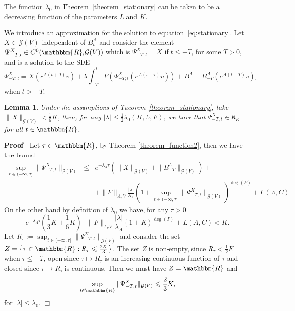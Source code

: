 \documentclass[11pt]{article}
\newcommand{\assign}{:=}
\newenvironment{proof}{\noindent\textbf{Proof\ }}{\hspace*{\fill}$\Box$\medskip}
\newtheorem{lemma}{Lemma}
\begin{document}
\begin{remark}
  \label{remark_lambda0}The function $\lambda_0$ in
  Theorem~\ref{theorem_stationary} can be taken to be a decreasing function of
  the parameters $L$ and $K$.
\end{remark}

We introduce an approximation for the solution to
equation~{\eqref{eq:stationary}}. Let $X \in \mathcal{G} (V)$ independent of
$B^A_t$ and consider the element $\Psi_{- T, t}^X \in C^0 (\mathbbm{R},
\mathcal{G} (V))$ which is $\Psi_{- T, t}^X = X$ if $t \leqslant - T$, for
some $T > 0$, and is a solution to the SDE
\[ \Psi_{- T, t}^X = X (e^{A (t + T)} v) + \lambda \int_{- T}^t F (\Psi_{- T,
   t}^X (e^{A (t - \tau)} v)) + B^A_t - B^A_{- T} (e^{A (t + T)} v), \]
when $t > - T$.

\begin{lemma}
  \label{lemma_bound}Under the assumptions of
  Theorem~\ref{theorem_stationary}, take $\| X \|_{\mathcal{G} (V)} <
  \frac{1}{6} K$, then, for any $| \lambda | \leqslant \frac{1}{2} \lambda_0
  (K, L, F)$, we have that $\Psi_{- T, t}^X \in \mathfrak{K}_K$ for all $t \in
  \mathbbm{R}$.
\end{lemma}

\begin{proof}
  Let $\tau \in \mathbbm{R}$, by Theorem \ref{theorem_function2}, then we have
  the bound
  \begin{eqnarray}
    \sup_{t \in (- \infty, \tau]} \| \Psi^X_{- T, t} \|_{\mathcal{G} (V)} &
    \leqslant & e^{- \lambda_A \tau} (\| X \|_{\mathcal{G} (V)} + \| B_{- T}^A
    \|_{\mathcal{G} (V)}) + \nonumber\\
    &  & + \| F \|_{\Lambda_{\pi} V} \frac{| \lambda |}{\lambda_A} (1 +
    \sup_{t \in (- \infty, \tau]} \| \Psi_{- T, t}^X \|_{\mathcal{G}
    (V)})^{\deg (F)} + L (A, C) . \nonumber
  \end{eqnarray}
  On the other hand by definition of $\lambda_0$ we have, for any $\tau > 0$
  \[ e^{- \lambda_A \tau} \left( \frac{1}{3} K + \frac{1}{6} K \right) + \| F
     \|_{\Lambda_{\pi} V} \frac{| \lambda |}{\lambda_A} (1 + K)^{\deg (F)} + L
     (A, C) < K. \]
  Let $R_{\tau} \assign \sup_{t \in (- \infty, \tau]} \| \Psi_{- T, t}^X
  \|_{\mathcal{G} (V)}$ and consider the set $Z = \left\{ \tau \in \mathbbm{R}:
  R_{\tau} \leqslant \frac{2 K}{3} \right\}$. The set $Z$ is non-empty, since
  $R_{\tau} < \frac{1}{2} K$ when $\tau \leqslant - T$, open since $\tau
  \mapsto R_{\tau}$ is an increasing continuous function of $\tau$ and closed
  since $\tau \rightarrow R_{\tau}$ is continuous. Then we must have $Z
  =\mathbbm{R}$ and
  \[ \sup_{t \in \mathbbm{R}} \| \Psi_{- T, t}^X \|_{\mathcal{G} (V)}
     \leqslant \frac{2}{3} K, \]
  for $| \lambda | \leqslant \lambda_0$.
\end{proof}
\end{document}
